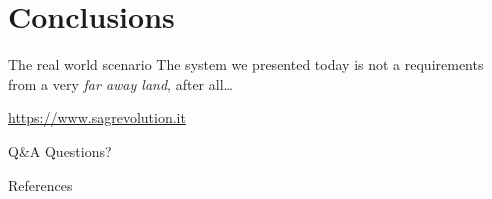

\section[Conclusions]{Conclusions}

\begin{frame}{The real world scenario}
	The system we presented today is not a requirements from a very
	\textit{far away land}, after all\dots
	
	\begin{center}
		\url{https://www.sagrevolution.it}
	\end{center}

\end{frame}
\begin{frame}{Q\&A}
	Questions?
\end{frame}

\begin{frame}{References}
	\printbibliography[heading=none]
\end{frame}